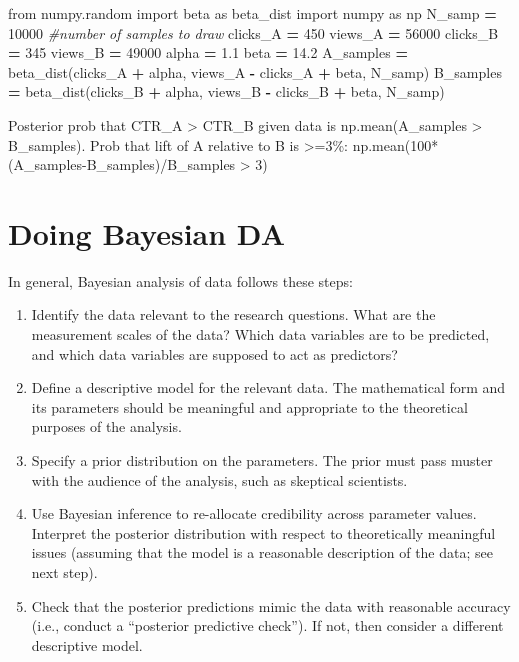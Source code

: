 \documentclass[]{book}
\newenvironment{Shaded}{\begin{snugshade}}{\end{snugshade}}
\newcommand{\DecValTok}[1]{\textcolor[rgb]{0.00,0.00,0.81}{#1}}
\newcommand{\FloatTok}[1]{\textcolor[rgb]{0.00,0.00,0.81}{#1}}
\newcommand{\ImportTok}[1]{#1}
\newcommand{\CommentTok}[1]{\textcolor[rgb]{0.56,0.35,0.01}{\textit{#1}}}
\newcommand{\OperatorTok}[1]{\textcolor[rgb]{0.81,0.36,0.00}{\textbf{#1}}}
\newcommand{\NormalTok}[1]{#1}
\begin{document}
\begin{Shaded}
\begin{Highlighting}[]
\ImportTok{from}\NormalTok{ numpy.random }\ImportTok{import}\NormalTok{ beta }\ImportTok{as}\NormalTok{ beta_dist}
\ImportTok{import}\NormalTok{ numpy }\ImportTok{as}\NormalTok{ np}
\NormalTok{N_samp }\OperatorTok{=} \DecValTok{10000} \CommentTok{#number of samples to draw}
\NormalTok{clicks_A }\OperatorTok{=} \DecValTok{450}
\NormalTok{views_A }\OperatorTok{=} \DecValTok{56000}
\NormalTok{clicks_B }\OperatorTok{=} \DecValTok{345}
\NormalTok{views_B }\OperatorTok{=} \DecValTok{49000}
\NormalTok{alpha }\OperatorTok{=} \FloatTok{1.1}
\NormalTok{beta }\OperatorTok{=} \FloatTok{14.2}
\NormalTok{A_samples }\OperatorTok{=}\NormalTok{ beta_dist(clicks_A }\OperatorTok{+}\NormalTok{ alpha, views_A }\OperatorTok{-}\NormalTok{ clicks_A }\OperatorTok{+}\NormalTok{ beta, N_samp)}
\NormalTok{B_samples }\OperatorTok{=}\NormalTok{ beta_dist(clicks_B }\OperatorTok{+}\NormalTok{ alpha, views_B }\OperatorTok{-}\NormalTok{ clicks_B }\OperatorTok{+}\NormalTok{ beta, N_samp)}
\end{Highlighting}
\end{Shaded}

Posterior prob that CTR\_A \textgreater{} CTR\_B given data is
np.mean(A\_samples \textgreater{} B\_samples). Prob that lift of A
relative to B is \textgreater{}=3\%:
np.mean(100*(A\_samples-B\_samples)/B\_samples \textgreater{} 3)

\section{Doing Bayesian DA}\label{doing-bayesian-da}

In general, Bayesian analysis of data follows these steps:

\begin{enumerate}
\def\labelenumi{\arabic{enumi}.}
\item
  Identify the data relevant to the research questions. What are the
  measurement scales of the data? Which data variables are to be
  predicted, and which data variables are supposed to act as predictors?
\item
  Define a descriptive model for the relevant data. The mathematical
  form and its parameters should be meaningful and appropriate to the
  theoretical purposes of the analysis.
\item
  Specify a prior distribution on the parameters. The prior must pass
  muster with the audience of the analysis, such as skeptical
  scientists.
\item
  Use Bayesian inference to re-allocate credibility across parameter
  values. Interpret the posterior distribution with respect to
  theoretically meaningful issues (assuming that the model is a
  reasonable description of the data; see next step).
\item
  Check that the posterior predictions mimic the data with reasonable
  accuracy (i.e., conduct a ``posterior predictive check''). If not,
  then consider a different descriptive model.
\end{enumerate}
\end{document}
